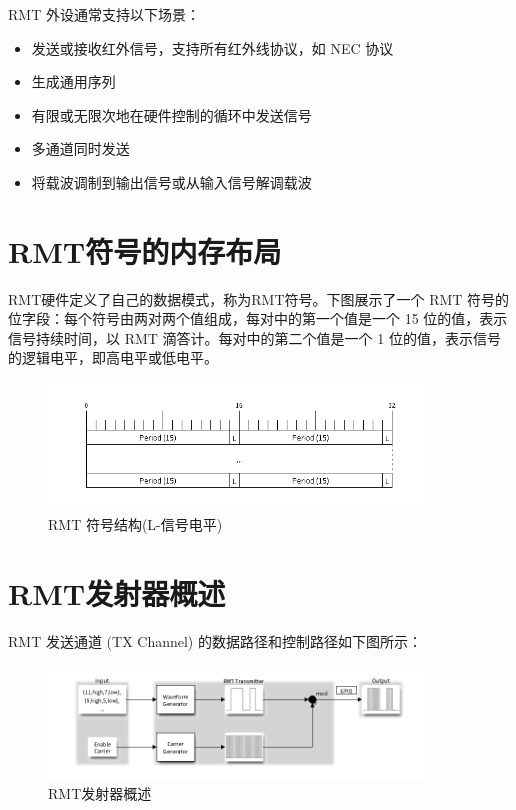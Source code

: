 \documentclass[lang=cn,newtx,10pt,scheme=chinese]{elegantbook}
\begin{document}
RMT 外设通常支持以下场景：

\begin{itemize}
\item 发送或接收红外信号，支持所有红外线协议，如 NEC 协议
\item 生成通用序列
\item 有限或无限次地在硬件控制的循环中发送信号
\item 多通道同时发送
\item 将载波调制到输出信号或从输入信号解调载波
\end{itemize}

\section{RMT符号的内存布局}

RMT硬件定义了自己的数据模式，称为RMT符号。下图展示了一个 RMT 符号的位字段：每个符号由两对两个值组成，每对中的第一个值是一个 15 位的值，表示信号持续时间，以 RMT 滴答计。每对中的第二个值是一个 1 位的值，表示信号的逻辑电平，即高电平或低电平。

\begin{figure}[!htb]
\centering
\includegraphics[width=0.9\textwidth]{RMT-1.png}
\caption{RMT 符号结构(L-信号电平)}
\end{figure}

\section{RMT发射器概述}

RMT 发送通道 (TX Channel) 的数据路径和控制路径如下图所示：

\begin{figure}[!htb]
\centering
\includegraphics[width=0.9\textwidth]{RMT-2.png}
\caption{RMT发射器概述}
\end{figure}
\end{document}
